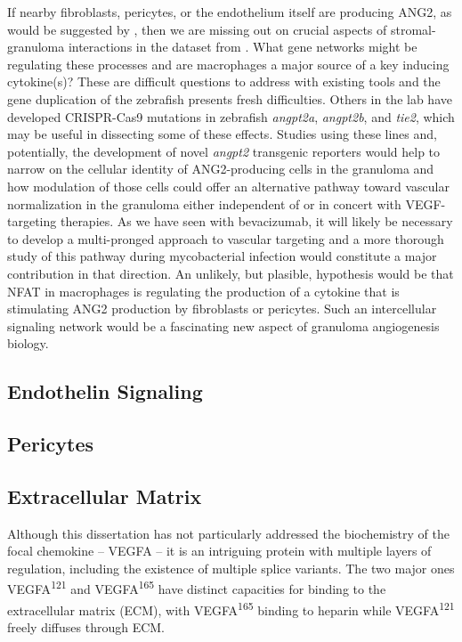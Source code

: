 If nearby fibroblasts, pericytes, or the endothelium itself are producing ANG2, as would be suggested by \citet{Gideon2022}, then we are missing out on crucial aspects of stromal-granuloma interactions in the dataset from \citet{Cronan2021}. What gene networks might be regulating these processes and are macrophages a major source of a key inducing cytokine(s)? These are difficult questions to address with existing tools and the gene duplication of the zebrafish presents fresh difficulties. Others in the lab have developed CRISPR-Cas9 mutations in zebrafish \textit{angpt2a}, \textit{angpt2b}, and \textit{tie2}, which may be useful in dissecting some of these effects. Studies using these lines and, potentially, the development of novel \textit{angpt2} transgenic reporters would help to narrow on the cellular identity of ANG2-producing cells in the granuloma and how modulation of those cells could offer an alternative pathway toward vascular normalization in the granuloma either independent of or in concert with VEGF-targeting therapies. As we have seen with bevacizumab, it will likely be necessary to develop a multi-pronged approach to vascular targeting and a more thorough study of this pathway during mycobacterial infection would constitute a major contribution in that direction. An unlikely, but plasible, hypothesis would be that NFAT in macrophages is regulating the production of a cytokine that is stimulating ANG2 production by fibroblasts or pericytes. Such an intercellular signaling network would be a fascinating new aspect of granuloma angiogenesis biology.

\subsection{Endothelin Signaling}

\subsection{Pericytes}

\citep{Correa2014}
\citep{ClaessonWelsh2015}
\citep{Eklund2017}
\citep{Hato2008}
\citep{Sakamoto2010}
\citep{Keskin2015}
\citep{Shin2016}

\subsection{Extracellular Matrix}

Although this dissertation has not particularly addressed the biochemistry of the focal chemokine -- VEGFA -- it is an intriguing protein with multiple layers of regulation, including the existence of multiple splice variants. The two major ones VEGFA\textsuperscript{121} and VEGFA\textsuperscript{165} have distinct capacities for binding to the extracellular matrix (ECM), with VEGFA\textsuperscript{165} binding to heparin while VEGFA\textsuperscript{121} freely diffuses through ECM. 

